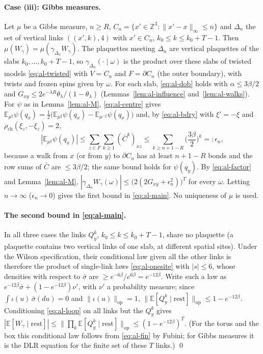 \documentclass[11pt,a4paper]{article}
\theoremstyle{remark}
\theoremstyle{definition}
\theoremstyle{plain}
\theoremstyle{remark}
\newcommand{\Z}{\mathbb{Z}}
\newcommand{\E}{\mathbb{E}}
\newcommand{\rch}{\rho_{\mathrm{ch}}}
\begin{document}
\paragraph{Case (iii): Gibbs measures.} Let $\mu$ be a Gibbs measure, $n\ge R$, $C_n=\{x'\in\Z^3:\|x'-x\|_\infty\le n\}$ and $\Delta_n$ the set of vertical links $((x',k),4)$ with $x'\in C_n$, $k_0\le k\le k_0+T-1$. Then $\mu(W_\gamma)=\mu(\gamma_{\Delta_n}W_\gamma)$. The plaquettes meeting $\Delta_n$ are vertical plaquettes of the slabs $k_0,\dots,k_0+T-1$, so $\gamma_{\Delta_n}(\cdot\mid\omega)$ is the product over these slabs of twisted models \eqref{eq:al-twisted} with $V=C_n$ and $F=\partial C_n$ (the outer boundary), with twists and frozen spins given by $\omega$. For each slab, \eqref{eq:al-dob} holds with $\alpha\le3\beta/2$ and $G_{xy}\le2e^{-\lambda R}\theta_\lambda/(1-\theta_\lambda)$ (Lemmas~\ref{lem:al-influence} and~\ref{lem:al-walks}). For $\psi$ as in Lemma~\ref{lem:al-M}, \eqref{eq:al-centre} gives $\E_{\mu^\xi}\psi(q_x)=\frac12\big(\E_{\mu^\xi}\psi(q_x)-\E_{\mu^{-\xi}}\psi(q_x)\big)$ and, by \eqref{eq:al-bdry} with $\xi'=-\xi$ and $\rch(\xi_z,-\xi_z)=2$,
\[
|\E_{\mu^\xi}\psi(q_x)|\le\sum_{z\in F}\sum_{k\ge1}(\bar C^k)_{xz}\le\sum_{k\ge n+1-R}\Big(\frac{3\beta}2\Big)^k=:\epsilon_n,
\]
because a walk from $x$ (or from $y$) to $\partial C_n$ has at least $n+1-R$ bonds and the row sums of $\bar C$ are $\le3\beta/2$; the same bound holds for $\psi(q_y)$. By \eqref{eq:al-factor} and Lemma~\ref{lem:al-M}, $|\gamma_{\Delta_n}W_\gamma(\omega)|\le\big(2(2G_{xy}+\epsilon_n^2)\big)^T$ for every $\omega$. Letting $n\to\infty$ ($\epsilon_n\to0$) gives the first bound in \eqref{eq:al-main}. No uniqueness of $\mu$ is used.

\paragraph{The second bound in \eqref{eq:al-main}.} In all three cases the links $Q^k_y$, $k_0\le k\le k_0+T-1$, share no plaquette (a plaquette contains two vertical links of one slab, at different spatial sites). Under the Wilson specification, their conditional law given all the other links is therefore the product of single-link laws \eqref{eq:al-onesite} with $|s|\le6$, whose densities with respect to $\bar\sigma$ are $\ge e^{-6\beta}/e^{6\beta}=e^{-12\beta}$. Write such a law as $e^{-12\beta}\bar\sigma+(1-e^{-12\beta})\nu'$, with $\nu'$ a probability measure; since $\int\iota(u)\,\bar\sigma(du)=0$ and $\|\iota(u)\|_{\mathrm{op}}=1$, $\|\E[Q^k_y\mid\text{rest}]\|_{\mathrm{op}}\le1-e^{-12\beta}$. Conditioning \eqref{eq:al-loop} on all links but the $Q^k_y$ gives $|\E[W_\gamma\mid\text{rest}]|\le\big\|\prod_k\E[Q^k_y\mid\text{rest}]\big\|_{\mathrm{op}}\le(1-e^{-12\beta})^T$. (For the torus and the box this conditional law follows from \eqref{eq:al-fin} by Fubini; for Gibbs measures it is the DLR equation for the finite set of these $T$ links.) \qed
\end{document}
